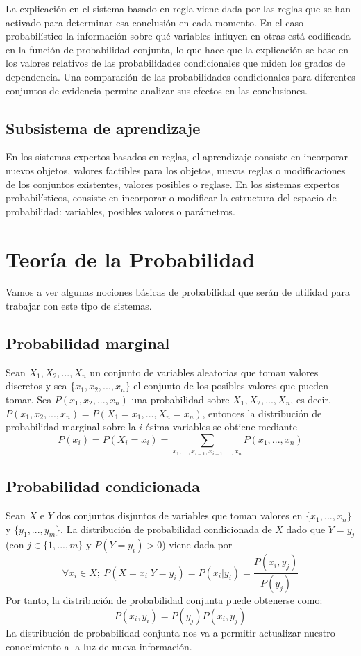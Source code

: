 \documentclass{article}
\theoremstyle{definition_wo_parentheses}
\begin{document}
La explicación en el sistema basado en regla viene dada por las reglas que se han activado para determinar esa conclusión en cada momento. En el caso probabilístico la información sobre qué variables influyen en otras está codificada en la función de probabilidad conjunta, lo que hace que la explicación se base en los valores relativos de las probabilidades condicionales que miden los grados de dependencia. Una comparación de las probabilidades condicionales para diferentes conjuntos de evidencia permite analizar sus efectos en las conclusiones.

\subsection{Subsistema de aprendizaje}

En los sistemas expertos basados en reglas, el aprendizaje consiste en incorporar nuevos objetos, valores factibles para los objetos, nuevas reglas o modificaciones de los conjuntos existentes, valores posibles o reglase. En los sistemas expertos probabilísticos, consiste en incorporar o modificar la estructura del espacio de probabilidad: variables, posibles valores o parámetros.

\section{Teoría de la Probabilidad}
Vamos a ver algunas nociones básicas de probabilidad que serán de utilidad para trabajar con este tipo de sistemas.

\subsection{Probabilidad marginal}
Sean $X_1,X_2,...,X_n$ un conjunto de variables aleatorias que toman valores discretos y sea $\{x_1,x_2,...,x_n\}$ el conjunto de los posibles valores que pueden tomar. Sea $P(x_1,x_2,...,x_n)$ una probabilidad sobre $X_1,X_2,...,X_n$, es decir, $P(x_1,x_2,...,x_n) = P(X_1 = x_1,...,X_n=x_n)$, entonces la distribución de probabilidad marginal sobre la $i$-ésima variables se obtiene mediante
\[	P(x_i) = P(X_i=x_i) = \sum_{x_1,...,x_{i-1},x_{i+1},...,x_n}P(x_1,...,x_n)	\]

\subsection{Probabilidad condicionada}
Sean $X$ e $Y$ dos conjuntos disjuntos de variables que toman valores en $\{x_1,...,x_n\}$ y $\{y_1,...,y_m\}$. La distribución de probabilidad condicionada de $X$ dado que $Y=y_j$ (con $j \in \{1,...,m\}$ y $P(Y=y_i)>0$) viene dada por
\[	\forall x_i \in X;\ P(X=x_i|Y=y_i)=P(x_i|y_i)=\frac{P(x_i,y_j)}{P(y_j)}	\]
Por tanto, la distribución de probabilidad conjunta puede obtenerse como:
\[	P(x_i,y_i)=P(y_j)P(x_i,y_j)	\]
La distribución de probabilidad conjunta nos va a permitir actualizar nuestro conocimiento a la luz de nueva información.
\end{document}
